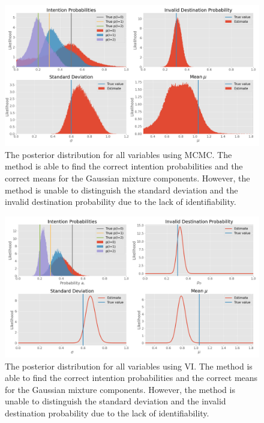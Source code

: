 \begin{figure}[h]
    \centering
    \includegraphics[width=\textwidth]{figures/example_mcmc.png}
    \caption{The posterior distribution for all variables using MCMC. The method is able to find the correct intention probabilities and the correct means for the Gaussian mixture components. However, the method is unable to distinguish the standard deviation and the invalid destination probability due to the lack of identifiability.}
    \label{fig:example_mcmc_posterior}
\end{figure}


\begin{figure}[h]
    \centering
    \includegraphics[width=\textwidth]{figures/example_vi.png}
    \caption{The posterior distribution for all variables using VI. The method is able to find the correct intention probabilities and the correct means for the Gaussian mixture components. However, the method is unable to distinguish the standard deviation and the invalid destination probability due to the lack of identifiability.}
    \label{fig:example_vi_posterior}
\end{figure}

